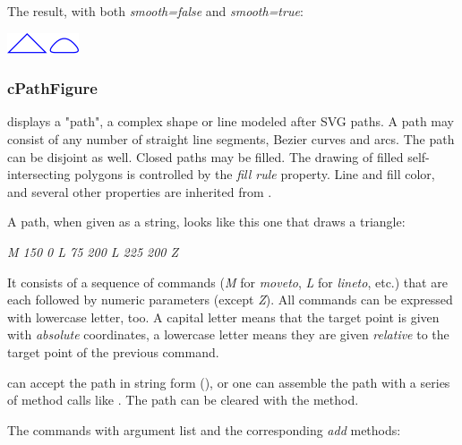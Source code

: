 
The result, with both \textit{smooth=false} and \textit{smooth=true}:

\begin{center}
\includegraphics[scale=4.0]{figures/figure-polygons}
\end{center}


\subsubsection{cPathFigure}

 displays a "path", a complex shape or line modeled after SVG
paths. A path may consist of any number of straight line segments, Bezier
curves and arcs. The path can be disjoint as well. Closed paths may be filled.
The drawing of filled self-intersecting polygons is controlled by the
\textit{fill rule} property. Line and fill color, and several other properties
are inherited from .

A path, when given as a string, looks like this one that draws a triangle:

\textit{M 150 0 L 75 200 L 225 200 Z}

It consists of a sequence of commands (\textit{M} for \textit{moveto},
\textit{L} for \textit{lineto}, etc.) that are each followed by numeric
parameters (except \textit{Z}). All commands can be expressed with
lowercase letter, too. A capital letter means that the target point is
given with \textit{absolute} coordinates, a lowercase letter means they are
given \textit{relative} to the target point of the previous command.

 can accept the path in string form (),
or one can assemble the path with a series of method calls like
. The path can be cleared with the 
method.

The commands with argument list and the corresponding \textit{add} methods:

